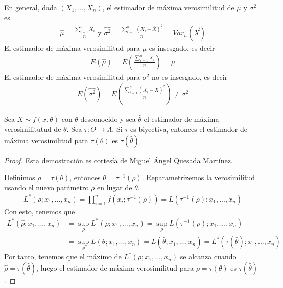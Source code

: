 \begin{obs}
    En general, dada $(X_1,...,X_n)$, el estimador de máxima verosimilitud de $\mu$ y $\sigma^2$ es
    \begin{align*}
        \hat{\mu} = \frac{\sum_{i=1}^{n}{X_i}}{n} \text{ \ \ \ y \ \ \ } \hat{\sigma^2} = \frac{\sum_{i=1}^{n}{(X_i -\overline{X})^2}}{n} = Var_n(\overrightarrow{X})
    \end{align*}
    El estimador de máxima verosimilitud para $\mu$ es insesgado, es decir
    \begin{align*}
        E(\hat{\mu}) = E\left( \frac{\sum_{i=1}^{n}{X_i}}{n} \right) = \mu
    \end{align*}
    El estimador de máxima verosimilitud para $\sigma^2$ no es insesgado, es decir
    \begin{align*}
        E(\hat{\sigma^2}) = E\left( \frac{\sum_{i=1}^{n}{(X_i -\overline{X})^2}}{n} \right)  \not = \sigma^2
    \end{align*}
\end{obs}

\begin{teo}
    Sea $X \sim f(x,\theta)$ con $\theta$ desconocido y sea $\hat{\theta}$ el estimador de máxima verosimilitutud de $\theta$. Sea $\tau : \Theta \longrightarrow \Lambda$. Si $\tau$ es biyectiva, entonces el estimador de máxima verosimilitud para $\tau(\theta)$ es $\tau(\hat{\theta})$.
\end{teo}

\begin{proof}
    Esta demostración es cortesía de Miguel Ángel Quesada Martínez.

    Definimos $\rho = \tau(\theta)$, entonces $\theta = \tau^{-1}(\rho)$. Reparametrizemos la verosimilitud usando el nuevo parámetro $\rho$ en lugar de $\theta$.
    \begin{align*}
        L^*(\rho;x_1,...,x_n) = \prod_{i=1}^{n}{f(x_i;\tau^{-1}(\rho))} = L(\tau^{-1}(\rho);x_1,...,x_n)
    \end{align*}
    Con esto, tenemos que
    \begin{align*}
        L^*(\hat{\rho};x_1,...,x_n) & = \sup_{\rho} L^*(\rho;x_1,...,x_n) = \sup_{\rho} L(\tau^{-1}(\rho);x_1,...,x_n)                          \\
                                    & = \sup_{\theta} L(\theta;x_1,...,x_n) = L(\hat{\theta};x_1,...,x_n) = L^*(\tau(\hat{\theta});x_1,...,x_n)
    \end{align*}
    Por tanto, tenemos que el máximo de $L^*(\rho;x_1,...,x_n)$ se alcanza cuando $\hat{\rho} = \tau(\hat{\theta})$, luego el estimador de máxima verosimilitud para $\rho = \tau(\theta)$ es $\tau(\hat{\theta})$.
\end{proof}

